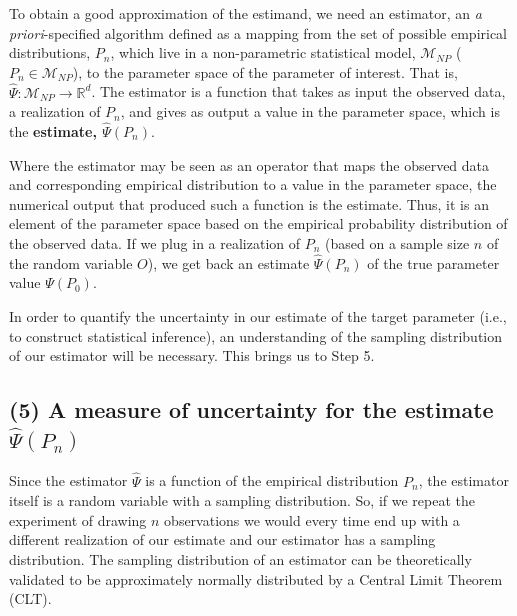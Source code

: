 \documentclass[
  12pt, krantz2,
]{book}
\theoremstyle{definition}
\theoremstyle{definition}
\theoremstyle{definition}
\newcommand{\1}{\mathbbm{1}}
\begin{document}
To obtain a good approximation of the estimand, we need an estimator, an \emph{a
priori}-specified algorithm defined as a mapping from the set of possible
empirical distributions, \(P_n\), which live in a non-parametric statistical
model, \(\mathcal{M}_{NP}\) (\(P_n \in \mathcal{M}_{NP}\)), to the parameter space
of the parameter of interest. That is, \(\hat{\Psi} : \mathcal{M}_{NP} \rightarrow \mathbb{R}^d\). The estimator is a function that takes as input
the observed data, a realization of \(P_n\), and gives as output a value in the
parameter space, which is the \textbf{estimate, \(\hat{\Psi}(P_n)\)}.

Where the estimator may be seen as an operator that maps the observed data and
corresponding empirical distribution to a value in the parameter space, the
numerical output that produced such a function is the estimate. Thus, it is an
element of the parameter space based on the empirical probability distribution
of the observed data. If we plug in a realization of \(P_n\) (based on a sample
size \(n\) of the random variable \(O\)), we get back an estimate \(\hat{\Psi}(P_n)\)
of the true parameter value \(\Psi(P_0)\).

In order to quantify the uncertainty in our estimate of the target parameter
(i.e., to construct statistical inference), an understanding of the sampling
distribution of our estimator will be necessary. This brings us to Step 5.

\hypertarget{a-measure-of-uncertainty-for-the-estimate-hatpsip_n}{%
\subsection*{\texorpdfstring{(5) A measure of uncertainty for the estimate \(\hat{\Psi}(P_n)\)}{(5) A measure of uncertainty for the estimate \textbackslash hat\{\textbackslash Psi\}(P\_n)}}\label{a-measure-of-uncertainty-for-the-estimate-hatpsip_n}}


Since the estimator \(\hat{\Psi}\) is a function of the empirical
distribution \(P_n\), the estimator itself is a random variable with a sampling
distribution. So, if we repeat the experiment of drawing \(n\) observations we
would every time end up with a different realization of our estimate and our
estimator has a sampling distribution. The sampling distribution of an estimator
can be theoretically validated to be approximately normally distributed by a
Central Limit Theorem (CLT).
\end{document}
